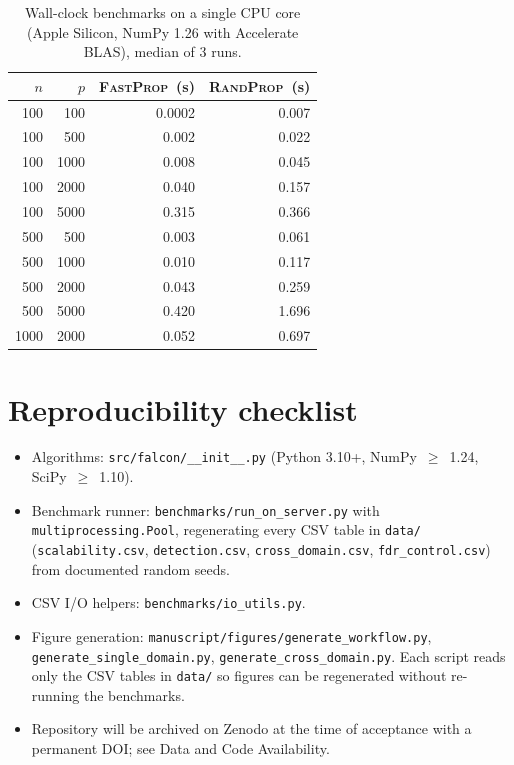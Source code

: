 \documentclass[11pt]{article}
\newcommand{\fastprop}{\textsc{FastProp}\xspace}
\newcommand{\randprop}{\textsc{RandProp}\xspace}
\theoremstyle{plain}
\begin{document}
\begin{table}[h]
\centering
\caption{Wall-clock benchmarks on a single CPU core (Apple Silicon,
NumPy 1.26 with Accelerate BLAS), median of 3 runs.}
\label{tab:scalability}
\begin{tabular}{@{}rrrr@{}}
\toprule
$n$ & $p$ & \fastprop\ (s) & \randprop\ (s) \\
\midrule
100 & 100 & 0.0002 & 0.007 \\
100 & 500 & 0.002 & 0.022 \\
100 & 1000 & 0.008 & 0.045 \\
100 & 2000 & 0.040 & 0.157 \\
100 & 5000 & 0.315 & 0.366 \\
500 & 500 & 0.003 & 0.061 \\
500 & 1000 & 0.010 & 0.117 \\
500 & 2000 & 0.043 & 0.259 \\
500 & 5000 & 0.420 & 1.696 \\
1000 & 2000 & 0.052 & 0.697 \\
\bottomrule
\end{tabular}
\end{table}

\section{Reproducibility checklist}
\label{sec:repro}

\begin{itemize}
\item Algorithms: \texttt{src/falcon/\_\_init\_\_.py} (Python 3.10+,
  NumPy~$\geq$~1.24, SciPy~$\geq$~1.10).
\item Benchmark runner: \texttt{benchmarks/run\_on\_server.py} with
  \texttt{multiprocessing.Pool}, regenerating every CSV table in
  \texttt{data/} (\texttt{scalability.csv}, \texttt{detection.csv},
  \texttt{cross\_domain.csv}, \texttt{fdr\_control.csv}) from documented
  random seeds.
\item CSV I/O helpers: \texttt{benchmarks/io\_utils.py}.
\item Figure generation: \texttt{manuscript/figures/generate\_workflow.py},
  \texttt{generate\_single\_domain.py}, \texttt{generate\_cross\_domain.py}.
  Each script reads only the CSV tables in \texttt{data/} so figures can
  be regenerated without re-running the benchmarks.
\item Repository will be archived on Zenodo at the time of acceptance with
  a permanent DOI; see Data and Code Availability.
\end{itemize}



\end{document}
